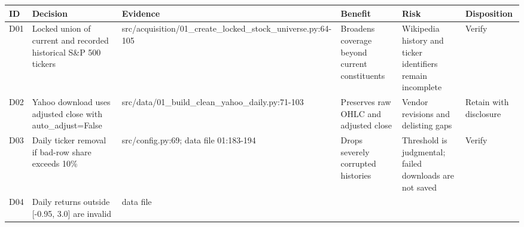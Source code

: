 \documentclass[
  11pt,
  a4paper]{article}
\newcounter{none} %
\begin{document}
{\def\LTcaptype{none} %
\begin{landscape}
\scriptsize
\begin{longtable}[]{@{}
  >{\raggedright\arraybackslash}p{}
  >{\raggedright\arraybackslash}p{}
  >{\raggedright\arraybackslash}p{}
  >{\raggedright\arraybackslash}p{}
  >{\raggedright\arraybackslash}p{}
  >{\raggedright\arraybackslash}p{}@{}}
\toprule\noalign{}
\begin{minipage}[b]{\linewidth}\raggedright
ID
\end{minipage} & \begin{minipage}[b]{\linewidth}\raggedright
Decision
\end{minipage} & \begin{minipage}[b]{\linewidth}\raggedright
Evidence
\end{minipage} & \begin{minipage}[b]{\linewidth}\raggedright
Benefit
\end{minipage} & \begin{minipage}[b]{\linewidth}\raggedright
Risk
\end{minipage} & \begin{minipage}[b]{\linewidth}\raggedright
Disposition
\end{minipage} \\
\midrule\noalign{}
\endhead
\bottomrule\noalign{}
\endlastfoot
D01 & Locked union of current and recorded historical S\&P 500 tickers &
src/acquisition/01\_\allowbreak{}create\_\allowbreak{}locked\_\allowbreak{}stock\_\allowbreak{}universe.py:64-105 & Broadens
coverage beyond current constituents & Wikipedia history and ticker
identifiers remain incomplete & Verify \\
D02 & Yahoo download uses adjusted close with auto\_\allowbreak{}adjust=False &
src/data/01\_\allowbreak{}build\_\allowbreak{}clean\_\allowbreak{}yahoo\_\allowbreak{}daily.py:71-103 & Preserves raw OHLC
and adjusted close & Vendor revisions and delisting gaps & Retain with
disclosure \\
D03 & Daily ticker removal if bad-row share exceeds 10\% &
src/config.py:69; data file 01:183-194 & Drops severely corrupted
histories & Threshold is judgmental; failed downloads are not saved &
Verify \\
D04 & Daily returns outside {[}-0.95, 3.0{]} are invalid & data file

\end{longtable}
\end{landscape}}
\end{document}
